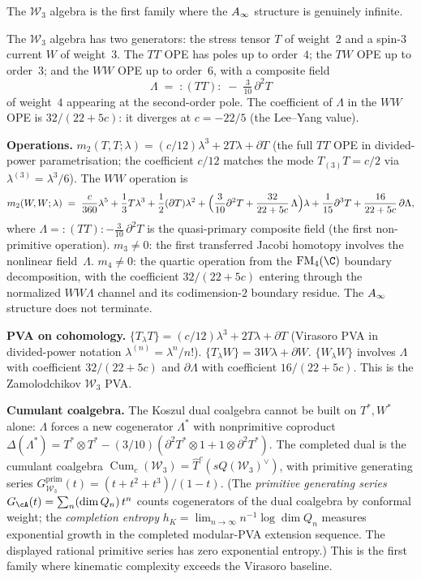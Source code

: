 The $\mathcal{W}_3$ algebra is the first family where the $A_\infty$
structure is genuinely infinite.

The $\mathcal{W}_3$ algebra has two generators: the stress tensor
$T$ of weight~$2$ and a spin-$3$ current $W$ of weight~$3$. The
$TT$ OPE has poles up to order~$4$; the $TW$ OPE up to order~$3$;
and the $WW$ OPE up to order~$6$, with a composite field
\[
\Lambda \;=\; :(TT): \;-\; \tfrac{3}{10}\,\partial^2 T
\]
of weight~$4$ appearing at the second-order pole. The coefficient
of $\Lambda$ in the $WW$ OPE is $32/(22 + 5c)$: it diverges at
$c = -22/5$ (the Lee--Yang value).

\smallskip
\noindent\textbf{Operations.}\enspace
$m_2(T,T;\lambda) = (c/12)\lambda^3 + 2T\lambda + \partial T$
(the full $TT$ OPE in divided-power parametrisation; the coefficient
$c/12$ matches the mode $T_{(3)}T = c/2$ via $\lambda^{(3)} = \lambda^3/6$).
The $WW$ operation is
\[
m_2(W,W;\lambda) \;=\; \frac{c}{360}\lambda^5
+ \frac{1}{3}T\lambda^3
+ \frac{1}{2}(\partial T)\lambda^2
+ \Bigl(\frac{3}{10}\partial^2 T + \frac{32}{22+5c}\,\Lambda\Bigr)\lambda
+ \frac{1}{15}\partial^3 T + \frac{16}{22+5c}\,\partial\Lambda,
\]
where $\Lambda = {}\!:(TT): - \tfrac{3}{10}\,\partial^2 T$ is the quasi-primary composite field (the first non-primitive operation). $m_3 \ne 0$: the first transferred Jacobi homotopy involves the
nonlinear field~$\Lambda$.
$m_4 \ne 0$: the quartic operation from the $\FM_4(\C)$ boundary
decomposition, with the coefficient $32/(22+5c)$ entering through
the normalized $WW\Lambda$ channel and its codimension-$2$ boundary
residue. The $A_\infty$ structure does not terminate.

\smallskip
\noindent\textbf{PVA on cohomology.}\enspace
$\{T_\lambda T\} = (c/12)\lambda^3 + 2T\lambda + \partial T$
(Virasoro PVA in divided-power notation $\lambda^{(n)} = \lambda^n/n!$).
$\{T_\lambda W\} = 3W\lambda + \partial W$.
$\{W_\lambda W\}$ involves $\Lambda$ with coefficient
$32/(22+5c)$ and $\partial\Lambda$ with coefficient $16/(22+5c)$. This is the Zamolodchikov $\mathcal{W}_3$ PVA\@.

\smallskip
\noindent\textbf{Cumulant coalgebra.}\enspace
The Koszul dual coalgebra cannot be built on $T^*, W^*$ alone:
$\Lambda$ forces a new cogenerator $\Lambda^*$ with nonprimitive
coproduct $\Delta(\Lambda^*) = T^* \otimes T^* -
(3/10)(\partial^2 T^* \otimes 1 + 1 \otimes \partial^2 T^*)$.
The completed dual is the cumulant coalgebra
$\operatorname{Cum}_c(\mathcal{W}_3) =
\hat{T}^c(sQ(\mathcal{W}_3)^\vee)$, with primitive generating
series
$G_{\mathcal{W}_3}^{\mathrm{prim}}(t) = (t + t^2 + t^3)/(1 - t)$.
(The \emph{primitive generating series} $G_\cA(t) = \sum_n (\dim Q_n)\, t^n$
counts cogenerators of the dual coalgebra by conformal weight;
the \emph{completion entropy} $h_K = \lim_{n\to\infty} n^{-1}\log\dim Q_n$
measures exponential growth in the completed modular-PVA extension
sequence. The displayed rational primitive series has zero
exponential entropy.)
This is
the first family where kinematic complexity exceeds the Virasoro
baseline.

